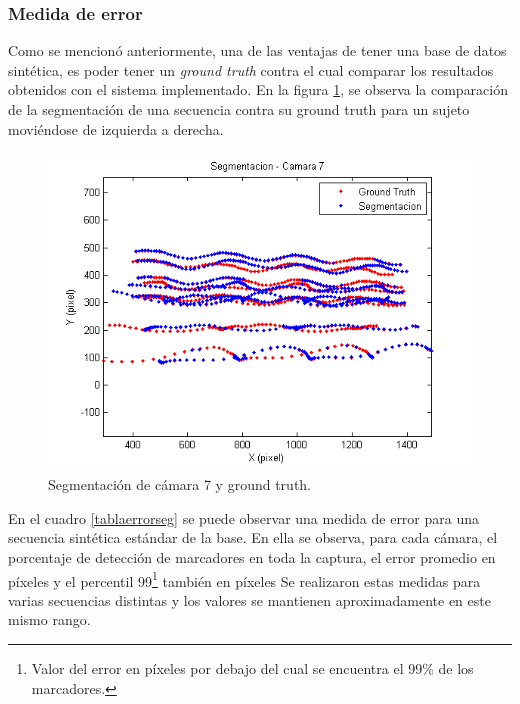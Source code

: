 \subsubsection{Medida de error}
Como se mencionó anteriormente, una de las ventajas de tener una base de datos sintética, es poder tener un \textit{ground truth} contra el cual comparar los resultados obtenidos con el sistema implementado. En la figura \ref{ejMedErr}, se observa la comparación de la segmentación de una secuencia contra su ground truth para un sujeto moviéndose de izquierda a derecha.
\vspace{-3mm}
\begin{figure}[H]
\begin{center}
\includegraphics[scale=0.6]{img/imagen_segmentacion_cam7_8_07_100_200.png}
\end{center}
\vspace{-7mm}
\caption{Segmentación de cámara 7 y ground truth.}
\label{ejMedErr}
\end{figure}

En el cuadro \ref{tablaerrorseg} se puede observar una medida de error para una secuencia sintética estándar de la base. En ella se observa, para cada cámara, el porcentaje de detección de marcadores en toda la captura, el error promedio en píxeles y el percentil 99\footnote{Valor del error en píxeles por debajo del cual se encuentra el 99\% de los marcadores.} también en píxeles Se realizaron estas medidas para varias secuencias distintas y los valores se mantienen aproximadamente en este mismo rango.

